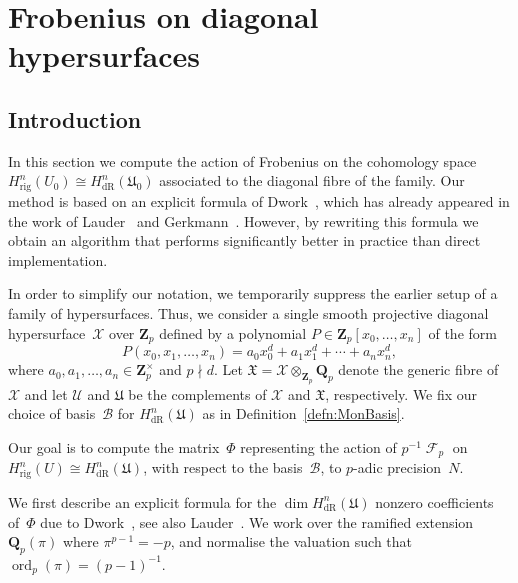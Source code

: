 \documentclass[a4paper,11pt]{article}
\numberwithin{equation}{section}
\newcommand{\ZZ}{\mathbf{Z}} %
\newcommand{\QQ}{\mathbf{Q}} %
\DeclareMathOperator{\ord}{ord}          %
\DeclareMathOperator{\Frob}{\mathcal{F}} %
\providecommand{\HdR}{H_{\text{dR}}}    %
\providecommand{\Hrig}{H_{\text{rig}}}  %
\providecommand{\cB}{\mathcal{B}} %
\theoremstyle{definition}
\begin{document}


\section{Frobenius on diagonal hypersurfaces}
\label{sec:Diagonal}

\subsection{Introduction}

In this section we compute the action of Frobenius on the cohomology 
space $\Hrig^{n}(U_0) \cong \HdR^{n}(\mathfrak{U}_0)$ associated 
to the diagonal fibre of the family. Our method is based on an 
explicit formula of Dwork~\citep[\S 4]{Dwork1964}, which has already 
appeared in the work of Lauder~\citep[\S 6]{Lauder2004b} and 
Gerkmann~\citep[\S 4.4]{Gerkmann2007}. However, by rewriting this formula 
we obtain an algorithm that performs significantly better in practice 
than direct implementation.

In order to simplify our notation, we temporarily suppress the earlier 
setup of a family of hypersurfaces. Thus, we consider a single smooth 
projective diagonal hypersurface~$\mathcal{X}$ over $\ZZ_p$ defined by 
a polynomial $P \in \ZZ_p[x_0, \dotsc, x_n]$ of the form
\begin{equation}
P(x_0, x_1, \dotsc, x_n) = 
    a_0 x_0^d + a_1 x_1^d + \dotsb + a_n x_n^d,
\end{equation}
where $a_0, a_1, \dotsc, a_n \in \ZZ_p^{\times}$ and $p \nmid d$. 
Let $\mathfrak{X} = \mathcal{X} \otimes_{\ZZ_p} \QQ_p$ denote the generic 
fibre of $\mathcal{X}$ and let $\mathcal{U}$ and $\mathfrak{U}$ be the complements
of $\mathcal{X}$ and $\mathfrak{X}$, respectively. 
We fix our choice of basis~$\cB$ for $\HdR^{n}(\mathfrak{U})$ 
as in Definition~\ref{defn:MonBasis}. 

Our goal is to compute 
the matrix~$\Phi$ representing the action of $p^{-1} \Frob_p$ on 
$\Hrig^n(U) \cong \HdR^n(\mathfrak{U})$, with respect to the basis~$\cB$, 
to $p$-adic precision~$N$.

We first describe an explicit formula for the $\dim \HdR^n(\mathfrak{U})$ 
nonzero coefficients of~$\Phi$ due to Dwork~\citep{Dwork1964},
see also Lauder~\citep[\S 6.1]{Lauder2004b}.  
We work over the ramified extension~$\QQ_p(\pi)$ where $\pi^{p-1} = -p$, 
and normalise the valuation such that \mbox{$\ord_p(\pi) = (p-1)^{-1}$}.
\end{document}
